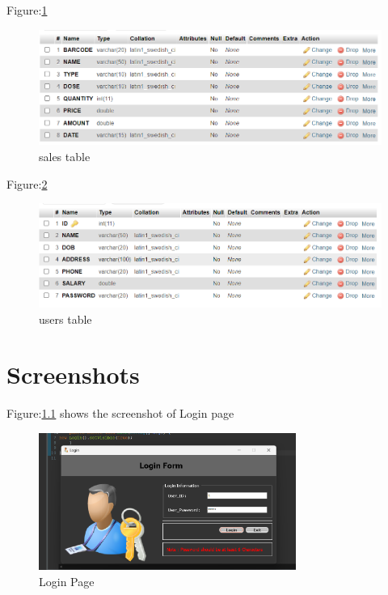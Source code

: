 \documentclass[12pt, letter paper]{report}
\begin{document}
\begin{center}
	Figure:\ref{fig:sales.png}
	\begin{figure}[h]
		\centering
		\includegraphics[width=1\textwidth]{sales.png}
		\caption{sales table}
		\label{fig:sales.png}
	\end{figure}
\end{center}
\newpage
\begin{center}
	Figure:\ref{fig:users.png}
	\begin{figure}[h]
		\centering
		\includegraphics[width=1\textwidth]{users.png}
		\caption{users table}
		\label{fig:users.png}
	\end{figure}
\end{center}


\chapter{Screenshots}

Figure:\ref{fig:home page.png} shows the screenshot of Login page 
\begin{figure}[h]
 \centering
 \includegraphics[width=0.75\textwidth]{home page.png}
 \caption{Login Page}
 \label{fig:home page.png}
\end{figure}
\end{document}
